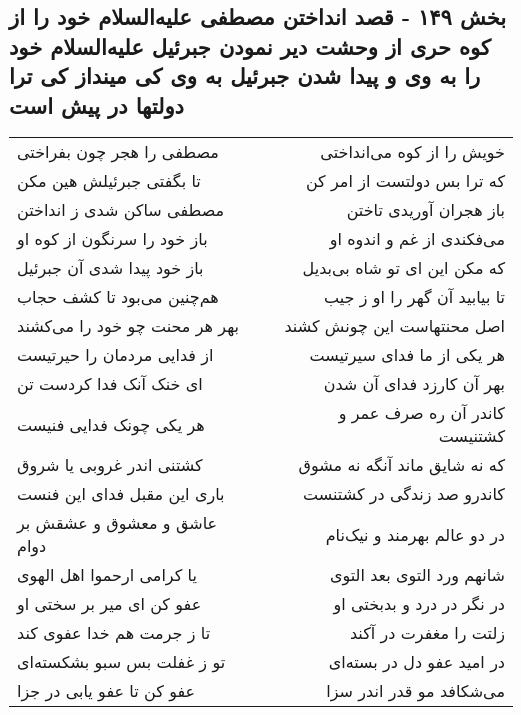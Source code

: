 \begin{center}
\section*{بخش ۱۴۹ - قصد انداختن مصطفی علیه‌السلام خود را از کوه حری از وحشت دیر نمودن جبرئیل علیه‌السلام خود را به وی و پیدا شدن  جبرئیل به وی کی مینداز کی ترا دولتها در پیش است}
\label{sec:sh149}
\begin{longtable}{l p{0.5cm} r}
مصطفی را هجر چون بفراختی
&&
خویش را از کوه می‌انداختی
\\
تا بگفتی جبرئیلش هین مکن
&&
که ترا بس دولتست از امر کن
\\
مصطفی ساکن شدی ز انداختن
&&
باز هجران آوریدی تاختن
\\
باز خود را سرنگون از کوه او
&&
می‌فکندی از غم و اندوه او
\\
باز خود پیدا شدی آن جبرئیل
&&
که مکن این ای تو شاه بی‌بدیل
\\
هم‌چنین می‌بود تا کشف حجاب
&&
تا بیابید آن گهر را او ز جیب
\\
بهر هر محنت چو خود را می‌کشند
&&
اصل محنتهاست این چونش کشند
\\
از فدایی مردمان را حیرتیست
&&
هر یکی از ما فدای سیرتیست
\\
ای خنک آنک فدا کردست تن
&&
بهر آن کارزد فدای آن شدن
\\
هر یکی چونک فدایی فنیست
&&
کاندر آن ره صرف عمر و کشتنیست
\\
کشتنی اندر غروبی یا شروق
&&
که نه شایق ماند آنگه نه مشوق
\\
باری این مقبل فدای این فنست
&&
کاندرو صد زندگی در کشتنست
\\
عاشق و معشوق و عشقش بر دوام
&&
در دو عالم بهرمند و نیک‌نام
\\
یا کرامی ارحموا اهل الهوی
&&
شانهم ورد التوی بعد التوی
\\
عفو کن ای میر بر سختی او
&&
در نگر در درد و بدبختی او
\\
تا ز جرمت هم خدا عفوی کند
&&
زلتت را مغفرت در آکند
\\
تو ز غفلت بس سبو بشکسته‌ای
&&
در امید عفو دل در بسته‌ای
\\
عفو کن تا عفو یابی در جزا
&&
می‌شکافد مو قدر اندر سزا
\\
\end{longtable}
\end{center}
